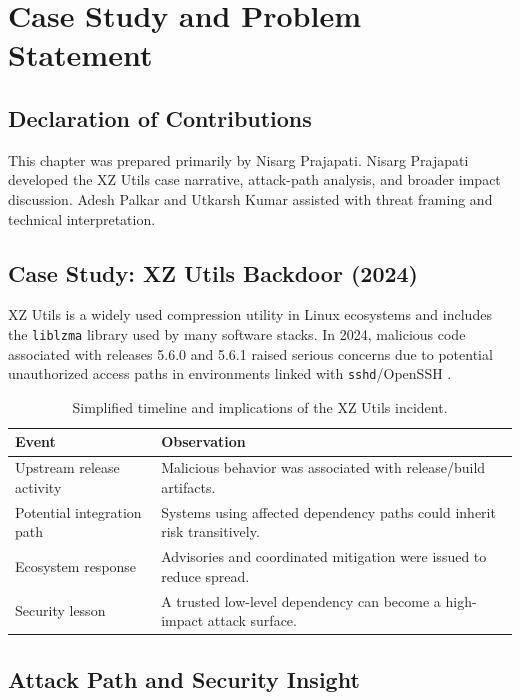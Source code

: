 \chapter{Case Study and Problem Statement}
\label{ch:casestudy}

\section*{Declaration of Contributions}
This chapter was prepared primarily by Nisarg Prajapati.
Nisarg Prajapati developed the XZ Utils case narrative, attack-path analysis,
and broader impact discussion. Adesh Palkar and Utkarsh Kumar assisted with
threat framing and technical interpretation.

\section{Case Study: XZ Utils Backdoor (2024)}

XZ Utils is a widely used compression utility in Linux ecosystems and includes
the \texttt{liblzma} library used by many software stacks.
In 2024, malicious code associated with releases 5.6.0 and 5.6.1 raised serious
concerns due to potential unauthorized access paths in environments linked with
\texttt{sshd}/OpenSSH \citep{nvd2024cve3094,redhat2024xz}.

\begin{table}[htbp]
\centering
\caption{Simplified timeline and implications of the XZ Utils incident.}
\label{tab:xz-timeline}
\begin{tabular}{p{} p{}}
\toprule
\textbf{Event} & \textbf{Observation} \\
\midrule
Upstream release activity & Malicious behavior was associated with release/build artifacts.
\\
Potential integration path & Systems using affected dependency paths could inherit risk transitively.
\\
Ecosystem response & Advisories and coordinated mitigation were issued to reduce spread.
\\
Security lesson & A trusted low-level dependency can become a high-impact attack surface.
\\
\bottomrule
\end{tabular}
\end{table}

\section{Attack Path and Security Insight}

